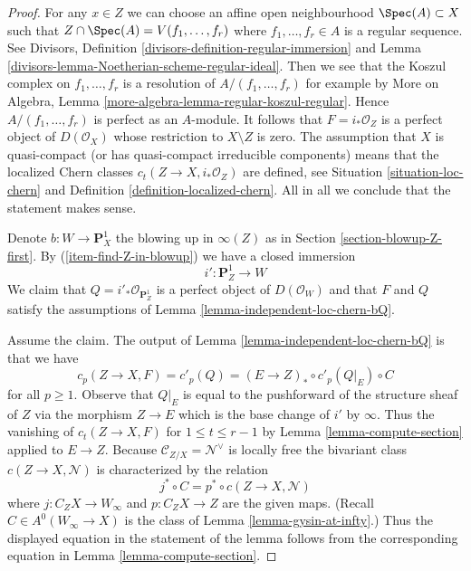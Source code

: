 \begin{proof}
For any $x \in Z$ we can choose an affine open neighbourhood
$\Spec(A) \subset X$ such that $Z \cap \Spec(A) = V(f_1, \ldots, f_r)$
where $f_1, \ldots, f_r \in A$ is a regular sequence.
See Divisors, Definition \ref{divisors-definition-regular-immersion} and
Lemma \ref{divisors-lemma-Noetherian-scheme-regular-ideal}.
Then we see that the Koszul complex on $f_1, \ldots, f_r$ is
a resolution of $A/(f_1, \ldots, f_r)$ for example by
More on Algebra, Lemma \ref{more-algebra-lemma-regular-koszul-regular}.
Hence $A/(f_1, \ldots, f_r)$ is perfect as an $A$-module.
It follows that $F = i_*\mathcal{O}_Z$ is a perfect object of
$D(\mathcal{O}_X)$ whose restriction to $X \setminus Z$ is zero.
The assumption that $X$ is quasi-compact (or has quasi-compact
irreducible components) means that the localized Chern classes
$c_t(Z \to X, i_*\mathcal{O}_Z)$ are defined, see
Situation \ref{situation-loc-chern} and
Definition \ref{definition-localized-chern}. All in all
we conclude that the statement makes sense.

\medskip\noindent
Denote $b : W \to \mathbf{P}^1_X$ the blowing up in $\infty(Z)$
as in Section \ref{section-blowup-Z-first}. By (\ref{item-find-Z-in-blowup})
we have a closed immersion
$$
i' : \mathbf{P}^1_Z \longrightarrow W
$$
We claim that $Q = i'_*\mathcal{O}_{\mathbf{P}^1_Z}$
is a perfect object of
$D(\mathcal{O}_W)$ and that $F$ and $Q$ satisfy the assumptions of
Lemma \ref{lemma-independent-loc-chern-bQ}.

\medskip\noindent
Assume the claim. The output of Lemma \ref{lemma-independent-loc-chern-bQ}
is that we have
$$
c_p(Z \to X, F) = c'_p(Q) = (E \to Z)_* \circ c'_p(Q|_E) \circ C
$$
for all $p \geq 1$. Observe that $Q|_E$ is equal to the pushforward of
the structure sheaf of $Z$ via the morphism $Z \to E$ which is the
base change of $i'$ by $\infty$.
Thus the vanishing of $c_t(Z \to X, F)$ for $1 \leq t \leq r - 1$
by Lemma \ref{lemma-compute-section} applied to $E \to Z$.
Because $\mathcal{C}_{Z/X} = \mathcal{N}^\vee$
is locally free the bivariant class $c(Z \to X, \mathcal{N})$
is characterized by the relation
$$
j^* \circ C = p^* \circ c(Z \to X, \mathcal{N})
$$
where $j : C_ZX \to W_\infty$ and $p : C_ZX \to Z$ are the given maps.
(Recall $C \in A^0(W_\infty \to X)$ is the class of
Lemma \ref{lemma-gysin-at-infty}.)
Thus the displayed equation in the statement of the lemma
follows from the corresponding equation in Lemma \ref{lemma-compute-section}.


\end{proof}

